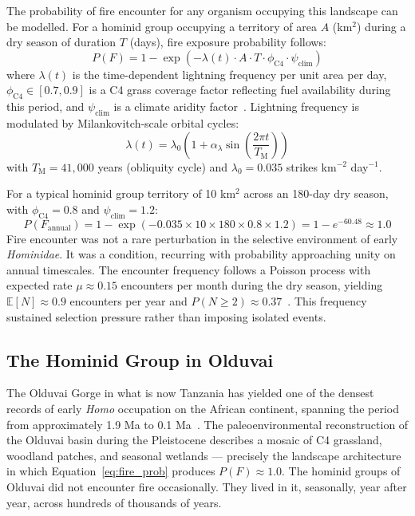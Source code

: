 The probability of fire encounter for any organism occupying this landscape can be modelled. For a hominid group occupying a territory of area $A$ (km$^2$) during a dry season of duration $T$ (days), fire exposure probability follows:
%
\begin{equation}
P(F) = 1 - \exp\!\left(-\lambda(t) \cdot A \cdot T \cdot \phi_{\mathrm{C4}} \cdot \psi_{\mathrm{clim}}\right)
\label{eq:fire_prob}
\end{equation}
%
where $\lambda(t)$ is the time-dependent lightning frequency per unit area per day, $\phi_{\mathrm{C4}} \in [0.7, 0.9]$ is a C4 grass coverage factor reflecting fuel availability during this period, and $\psi_{\mathrm{clim}}$ is a climate aridity factor~\cite{author_fire_catalyst}. Lightning frequency is modulated by Milankovitch-scale orbital cycles:
%
\begin{equation}
\lambda(t) = \lambda_0 \left(1 + \alpha_{\lambda} \sin\!\left(\frac{2\pi t}{T_{\mathrm{M}}}\right)\right)
\end{equation}
%
with $T_{\mathrm{M}} = 41{,}000$ years (obliquity cycle) and $\lambda_0 = 0.035$ strikes km$^{-2}$ day$^{-1}$.

For a typical hominid group territory of 10 km$^2$ across an 180-day dry season, with $\phi_{\mathrm{C4}} = 0.8$ and $\psi_{\mathrm{clim}} = 1.2$:
%
\begin{equation}
P(F_{\mathrm{annual}}) = 1 - \exp(-0.035 \times 10 \times 180 \times 0.8 \times 1.2)
= 1 - e^{-60.48} \approx 1.0
\end{equation}
%
Fire encounter was not a rare perturbation in the selective environment of early \textit{Hominidae}. It was a condition, recurring with probability approaching unity on annual timescales. The encounter frequency follows a Poisson process with expected rate $\mu \approx 0.15$ encounters per month during the dry season, yielding $\mathbb{E}[N] \approx 0.9$ encounters per year and $P(N \geq 2) \approx 0.37$~\cite{author_fire_catalyst}. This frequency sustained selection pressure rather than imposing isolated events.

\subsection{The Hominid Group in Olduvai}

The Olduvai Gorge in what is now Tanzania has yielded one of the densest records of early \textit{Homo} occupation on the African continent, spanning the period from approximately 1.9 Ma to 0.1 Ma~\cite{reed1997}. The paleoenvironmental reconstruction of the Olduvai basin during the Pleistocene describes a mosaic of C4 grassland, woodland patches, and seasonal wetlands --- precisely the landscape architecture in which Equation~\eqref{eq:fire_prob} produces $P(F) \approx 1.0$. The hominid groups of Olduvai did not encounter fire occasionally. They lived in it, seasonally, year after year, across hundreds of thousands of years.

